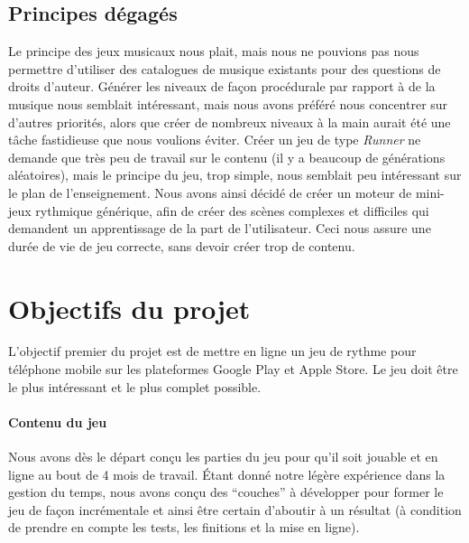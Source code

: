 \subsection{Principes dégagés}
Le principe des jeux musicaux nous plait, mais nous ne pouvions pas nous permettre d'utiliser des catalogues de musique existants pour des questions de droits d'auteur. Générer les niveaux de façon procédurale par rapport à de la musique nous semblait intéressant, mais nous avons préféré nous concentrer sur d'autres priorités, alors que créer de nombreux niveaux à la main aurait été une tâche fastidieuse que nous voulions éviter. Créer un jeu de type \textit{Runner} ne demande que très peu de travail sur le contenu (il y a beaucoup de générations aléatoires), mais le principe du jeu, trop simple, nous semblait peu intéressant sur le plan de l'enseignement. Nous avons ainsi décidé de créer un moteur de mini-jeux rythmique générique, afin de créer des scènes complexes et difficiles qui demandent un apprentissage de la part de l'utilisateur. Ceci nous assure une durée de vie de jeu correcte, sans devoir créer trop de contenu.


\section{Objectifs du projet}

L'objectif premier du projet est de mettre en ligne un jeu de rythme pour téléphone mobile sur les plateformes Google Play et Apple Store. Le jeu doit être le plus intéressant et le plus complet possible.

\paragraph{Contenu du jeu}
Nous avons dès le départ conçu les parties du jeu pour qu’il soit jouable et en ligne au bout de 4 mois de travail. Étant donné notre légère expérience dans la gestion du temps, nous avons conçu des “couches” à développer pour former le jeu de façon incrémentale et ainsi être certain d’aboutir à un résultat (à condition de prendre en compte les tests, les finitions et la mise en ligne).

